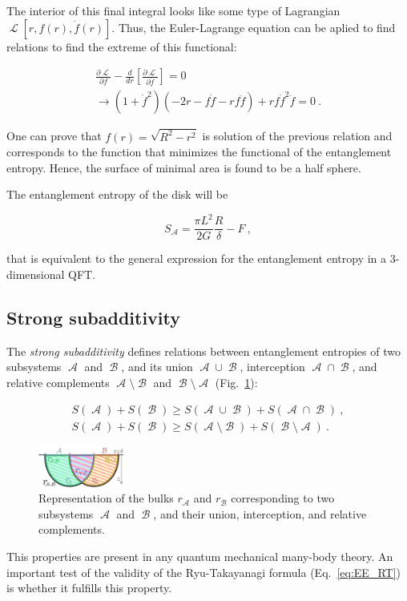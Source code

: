 \documentclass[twocolumn]{revtex4}
\providecommand{\eq}[2]{
    \begin{equation}
        #2
    \label{eq:#1}
    \end{equation}
}
\providecommand{\eqgat}[2]{
    \begin{gather}
        #2
    \label{eq:#1}
    \end{gather}
}
\DeclareMathOperator{\calA}{\mathcal{A}}
\DeclareMathOperator{\calB}{\mathcal{B}}
\DeclareMathOperator{\calL}{\mathcal{L}}
\begin{document}
The interior of this final integral looks like some type of Lagrangian $\calL [r,f(r),\dot{f}(r)]$. Thus, the Euler-Lagrange equation can be aplied to find relations to find the extreme of this functional:
\eqgat{1EL}{
    \frac{\partial \calL}{\partial f} - \frac{d}{dr} \left[ \frac{\partial \calL}{\partial \dot{f}} \right] = 0 \nonumber \\
    \longrightarrow \left( 1+\dot{f}^2 \right) \left( -2r-f\dot{f}-rf\ddot{f} \right) + rf\dot{f}^2\ddot{f} = 0 \ .
}

One can prove that $f(r) = \sqrt{R^2 - r^2}$ is solution of the previous relation and corresponds to the function that minimizes the functional of the entanglement entropy. Hence, the surface of minimal area is found to be a half sphere.

The entanglement entropy of the disk will be
\eq{1sol}{
    S_{\calA} = \frac{\pi L^2}{2G} \frac{R}{\delta} - F \ ,
}
that is equivalent to the general expression for the entanglement entropy in a 3-dimensional QFT.


\subsection{Strong subadditivity} \label{ss:SS}

The \textit{strong subadditivity} \cite{headrick_holographic_2007} defines relations between entanglement entropies of two subsystems $\calA$ and $\calB$, and its union $\calA \cup \calB$, interception $\calA \cap \calB$, and relative complements $\calA \setminus \calB$ and $\calB \setminus \calA$ (Fig.~\ref{fig:SS}):
\eqgat{EE_strong-subadd}{
    S(\calA) + S(\calB) \ge S(\calA \cup \calB) + S(\calA \cap \calB) \ , \nonumber \\
    S(\calA) + S(\calB) \ge S(\calA \setminus \calB) + S(\calB \setminus \calA) \ .
}

\begin{figure}
    \centering
    \includegraphics[width=0.25\textwidth]{../Imatges/SS_D.png}
\caption{Representation of the bulks $r_{\calA}$ and $r_{\calB}$ corresponding to two subsystems $\calA$ and $\calB$, and their union, interception, and relative complements.}
\label{fig:SS}
\end{figure}

This properties are present in any quantum mechanical many-body theory. An important test of the validity of the Ryu-Takayanagi formula (Eq.~\ref{eq:EE_RT}) is whether it fulfills this property.
\end{document}
